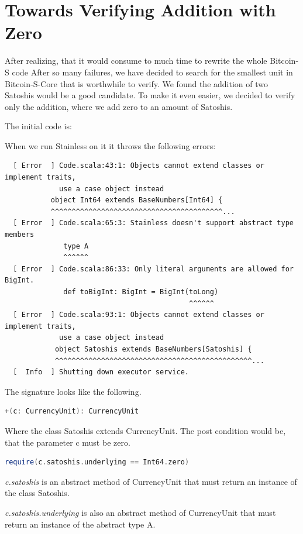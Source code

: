 \chapter{Towards Verifying Addition with Zero}
After realizing, that it would consume to much time to rewrite the whole Bitcoin-S code
After so many failures, we have decided to search for the smallest unit in Bitcoin-S-Core that is worthwhile to verify.
We found the addition of two Satoshis would be a good candidate.
To make it even easier, we decided to verify only the addition, where we add zero to an amount of Satoshis.

The initial code is:


When we run Stainless on it it throws the following errors:
{\footnotesize\begin{verbatim}
  [ Error  ] Code.scala:43:1: Objects cannot extend classes or implement traits,
             use a case object instead
           object Int64 extends BaseNumbers[Int64] {
           ^^^^^^^^^^^^^^^^^^^^^^^^^^^^^^^^^^^^^^^^^...
  [ Error  ] Code.scala:65:3: Stainless doesn't support abstract type members
              type A
              ^^^^^^
  [ Error  ] Code.scala:86:33: Only literal arguments are allowed for BigInt.
              def toBigInt: BigInt = BigInt(toLong)
                                            ^^^^^^
  [ Error  ] Code.scala:93:1: Objects cannot extend classes or implement traits,
             use a case object instead
            object Satoshis extends BaseNumbers[Satoshis] {
            ^^^^^^^^^^^^^^^^^^^^^^^^^^^^^^^^^^^^^^^^^^^^^^^...
  [  Info  ] Shutting down executor service.
\end{verbatim}}

The signature looks like the following.
\begin{lstlisting}[language=scala]
  +(c: CurrencyUnit): CurrencyUnit
\end{lstlisting}

Where the class Satoshis extends CurrencyUnit.
The post condition would be, that the parameter c must be zero.
\begin{lstlisting}[language=scala]
  require(c.satoshis.underlying == Int64.zero)
\end{lstlisting}

\emph{c.satoshis} is an abstract method of CurrencyUnit that must return an instance of the class Satoshis.

\emph{c.satoshis.underlying} is also an abstract method of CurrencyUnit that must return an instance of the abstract type A.

